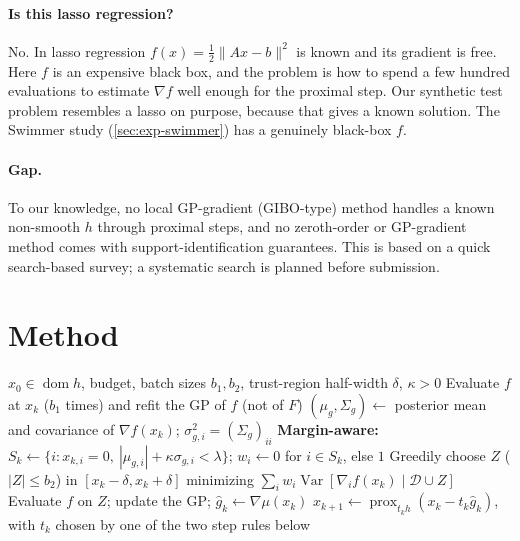 \documentclass[10pt]{article}
\newcommand{\prox}{\operatorname{prox}}
\theoremstyle{remark}
\begin{document}
\paragraph{Is this lasso regression?} No. In lasso regression $f(x)=\frac12\|Ax-b\|^2$ is known and its gradient is free. Here $f$ is an expensive
black box, and the problem is how to spend a few hundred evaluations to estimate $\nabla f$ well enough for the proximal step. Our synthetic
test problem resembles a lasso on purpose, because that gives a known solution. The Swimmer study (\cref{sec:exp-swimmer}) has a genuinely
black-box $f$.

\paragraph{Gap.} To our knowledge, no local GP-gradient (GIBO-type) method handles a known non-smooth $h$ through proximal steps, and no
zeroth-order or GP-gradient method comes with support-identification guarantees. This is based on a quick search-based survey; a systematic
search is planned before submission.

\section{Method}\label{sec:method}

\begin{algorithm}[h]
\caption{Prox-GIBO and margin-aware prox-GIBO (case A of \cref{tab:ext})}\label{alg:proxgibo}
\begin{algorithmic}[1]
\Require $x_0\in\operatorname{dom}h$, budget, batch sizes $b_1,b_2$, trust-region half-width $\delta$, $\kappa>0$
  \State Evaluate $f$ at $x_k$ ($b_1$ times) and refit the GP of $f$ (not of $F$)
  \State $(\mu_{g},\Sigma_g)\gets$ posterior mean and covariance of $\nabla f(x_k)$; $\sigma_{g,i}^2=(\Sigma_g)_{ii}$
  \State \textbf{Margin-aware:} $S_k\gets\{i: x_{k,i}=0,\ |\mu_{g,i}|+\kappa\sigma_{g,i}<\lambda\}$; $w_i\gets0$ for $i\in S_k$, else $1$
  \State Greedily choose $Z$ ($|Z|\le b_2$) in $[x_k-\delta,x_k+\delta]$ minimizing $\sum_i w_i\operatorname{Var}[\nabla_if(x_k)\mid\mathcal D\cup Z]$
  \State Evaluate $f$ on $Z$; update the GP; $\hat g_k\gets\nabla\mu(x_k)$
  \State $x_{k+1}\gets\prox_{t_kh}(x_k-t_k\hat g_k)$, with $t_k$ chosen by one of the two step rules below
\EndFor
\end{algorithmic}
\end{algorithm}
\end{document}
